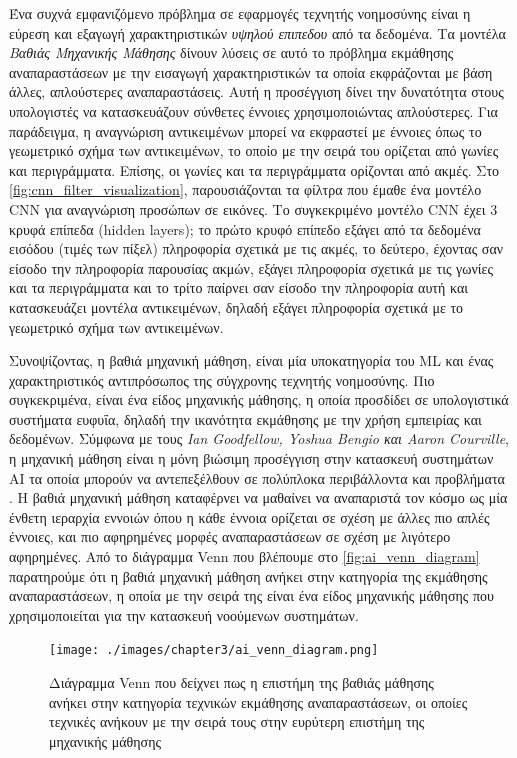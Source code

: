 Ένα συχνά εμφανιζόμενο πρόβλημα σε εφαρμογές τεχνητής νοημοσύνης είναι
η εύρεση και εξαγωγή χαρακτηριστικών \emph{υψηλού επιπεδου} από τα
δεδομένα. Τα μοντέλα \emph{Βαθιάς Μηχανικής Μάθησης} δίνουν λύσεις
σε αυτό το πρόβλημα εκμάθησης αναπαραστάσεων με την εισαγωγή χαρακτηριστικών
τα οποία εκφράζονται με βάση άλλες, απλούστερες αναπαραστάσεις. Αυτή η
προσέγγιση δίνει την δυνατότητα στους υπολογιστές να κατασκευάζουν σύνθετες
έννοιες χρησιμοποιώντας απλούστερες. Για παράδειγμα, η αναγνώριση αντικειμένων
μπορεί να εκφραστεί με έννοιες όπως το γεωμετρικό σχήμα των αντικειμένων,
το οποίο με την σειρά του ορίζεται από γωνίες και περιγράμματα. Επίσης,
οι γωνίες και τα περιγράμματα ορίζονται από ακμές. Στο \autoref{fig:cnn_filter_visualization},
παρουσιάζονται τα φίλτρα που έμαθε ένα μοντέλο CNN για αναγνώριση προσώπων σε εικόνες.
Το συγκεκριμένο μοντέλο CNN έχει 3 κρυφά επίπεδα (hidden layers); το πρώτο κρυφό
επίπεδο εξάγει από τα δεδομένα εισόδου (τιμές των πίξελ) πληροφορία σχετικά με
τις ακμές, το δεύτερο, έχοντας σαν είσοδο την πληροφορία παρουσίας ακμών, εξάγει πληροφορία
σχετικά με τις γωνίες και τα περιγράμματα και το τρίτο παίρνει σαν είσοδο
την πληροφορία αυτή και κατασκευάζει μοντέλα αντικειμένων, δηλαδή εξάγει πληροφορία
σχετικά με το γεωμετρικό σχήμα των αντικειμένων.

Συνοψίζοντας, η βαθιά μηχανική μάθηση, είναι μία υποκατηγορία του ML και ένας
χαρακτηριστικός αντιπρόσωπος της σύγχρονης
τεχνητής νοημοσύνης. Πιο συγκεκριμένα, είναι ένα είδος μηχανικής μάθησης, η
οποία προσδίδει σε υπολογιστικά συστήματα ευφυΐα, δηλαδή την ικανότητα
εκμάθησης με την χρήση εμπειρίας και δεδομένων. Σύμφωνα με τους
\emph{Ian Goodfellow, Yoshua Bengio και Aaron Courville}, η μηχανική μάθηση είναι η
μόνη βιώσιμη προσέγγιση στην κατασκευή συστημάτων AI τα οποία μπορούν να
αντεπεξέλθουν σε πολύπλοκα περιβάλλοντα και προβλήματα \cite{Goodfellow-et-al-2016-Book}.
Η βαθιά μηχανική μάθηση καταφέρνει να μαθαίνει να αναπαριστά τον κόσμο ως μία ένθετη
ιεραρχία εννοιών όπου η κάθε έννοια ορίζεται σε σχέση με άλλες πιο απλές έννοιες,
και πιο αφηρημένες μορφές αναπαραστάσεων σε σχέση με λιγότερο αφηρημένες.
Από το διάγραμμα Venn που βλέπουμε στο \autoref{fig:ai_venn_diagram} παρατηρούμε
ότι η βαθιά μηχανική μάθηση ανήκει στην κατηγορία της εκμάθησης αναπαραστάσεων,
η οποία με την σειρά της είναι ένα είδος μηχανικής μάθησης που χρησιμοποιείται
για την κατασκευή νοούμενων συστημάτων.

\begin{figure}[!ht]
  \centering
  \texttt{[image: ./images/chapter3/ai\_venn\_diagram.png]}
  \caption[Υπερσύνολα του κλάδου της βαθιάς μηχανικής μάθησης - Διάγραμμα Venn]{%
  Διάγραμμα Venn που δείχνει πως η επιστήμη της βαθιάς μάθησης ανήκει στην κατηγορία τεχνικών εκμάθησης αναπαραστάσεων, οι οποίες τεχνικές ανήκουν με την σειρά τους στην ευρύτερη επιστήμη της μηχανικής μάθησης}
  \label{fig:ai_venn_diagram}
\end{figure}
